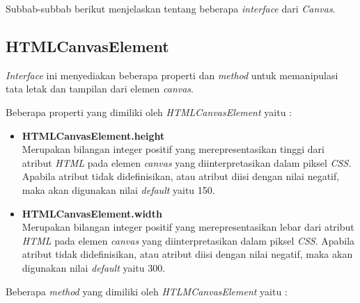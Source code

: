 Subbab-subbab berikut menjelaskan tentang beberapa \textit{interface} dari \textit{Canvas}.

\subsection{HTMLCanvasElement}
\textit{Interface} ini menyediakan beberapa properti dan \textit{method} untuk memanipulasi tata letak dan tampilan dari elemen \textit{canvas}.

Beberapa properti yang dimiliki oleh \textit{HTMLCanvasElement} yaitu : 

\begin{itemize}
	\item \textbf{HTMLCanvasElement.height} \\ Merupakan bilangan integer positif yang merepresentasikan tinggi dari atribut \textit{HTML} pada elemen \textit{canvas} yang diinterpretasikan dalam piksel \textit{CSS}. Apabila atribut tidak didefinisikan, atau atribut diisi dengan nilai negatif, maka akan digunakan nilai \textit{default} yaitu 150.
	
	\item \textbf{HTMLCanvasElement.width} \\ Merupakan bilangan integer positif yang merepresentasikan lebar dari atribut \textit{HTML} pada elemen \textit{canvas} yang diinterpretasikan dalam piksel \textit{CSS}. Apabila atribut tidak didefinisikan, atau atribut diisi dengan nilai negatif, maka akan digunakan nilai \textit{default} yaitu 300.
\end{itemize}

Beberapa \textit{method} yang dimiliki oleh \textit{HTLMCanvasElement} yaitu : 


